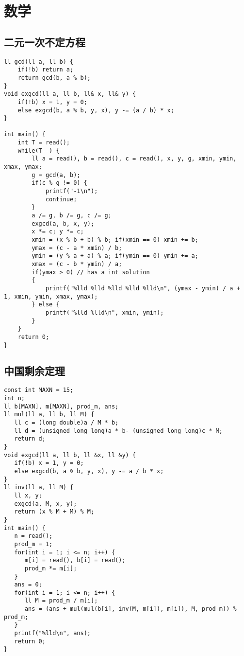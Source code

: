 \documentclass{article}
\begin{document}
    \section{数学}

    \subsection{二元一次不定方程}

\begin{lstlisting}
ll gcd(ll a, ll b) {
    if(!b) return a;
    return gcd(b, a % b);
}
void exgcd(ll a, ll b, ll& x, ll& y) {
    if(!b) x = 1, y = 0;
    else exgcd(b, a % b, y, x), y -= (a / b) * x;
}

int main() {
    int T = read();
    while(T--) {
        ll a = read(), b = read(), c = read(), x, y, g, xmin, ymin, xmax, ymax;
        g = gcd(a, b);
        if(c % g != 0) {
            printf("-1\n");
            continue;
        }
        a /= g, b /= g, c /= g;
        exgcd(a, b, x, y);
        x *= c; y *= c;
        xmin = (x % b + b) % b; if(xmin == 0) xmin += b;
        ymax = (c - a * xmin) / b;
        ymin = (y % a + a) % a; if(ymin == 0) ymin += a;
        xmax = (c - b * ymin) / a;
        if(ymax > 0) // has a int solution
        {
            printf("%lld %lld %lld %lld %lld\n", (ymax - ymin) / a + 1, xmin, ymin, xmax, ymax);
        } else {
            printf("%lld %lld\n", xmin, ymin);
        }
    }   
    return 0;
}
\end{lstlisting}

    \subsection{中国剩余定理}

\begin{lstlisting}
const int MAXN = 15;
int n;
ll b[MAXN], m[MAXN], prod_m, ans;
ll mul(ll a, ll b, ll M) {
   ll c = (long double)a / M * b;
   ll d = (unsigned long long)a * b- (unsigned long long)c * M;
   return d;
}
void exgcd(ll a, ll b, ll &x, ll &y) {
   if(!b) x = 1, y = 0;
   else exgcd(b, a % b, y, x), y -= a / b * x;
}
ll inv(ll a, ll M) {
   ll x, y;
   exgcd(a, M, x, y);
   return (x % M + M) % M;
}
int main() {
   n = read();
   prod_m = 1;
   for(int i = 1; i <= n; i++) {
      m[i] = read(), b[i] = read();
      prod_m *= m[i];
   }
   ans = 0;
   for(int i = 1; i <= n; i++) {
      ll M = prod_m / m[i];
      ans = (ans + mul(mul(b[i], inv(M, m[i]), m[i]), M, prod_m)) % prod_m;
   }
   printf("%lld\n", ans);
   return 0;
}
\end{lstlisting}
\end{document}
